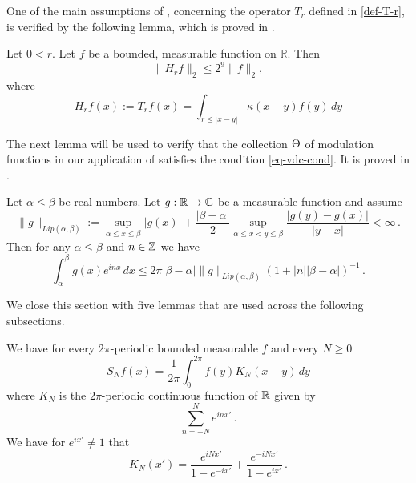 One of the main assumptions of , concerning the operator $T_r$ defined in \eqref{def-T-r}, is verified by the following lemma, which is proved in .
\begin{lemma}
    \label{Hilbert-strong-2-2}
    \leanok
    Let $0<r$. Let $f$ be a bounded, measurable function on $\mathbb{R}$. Then
    \begin{equation}
        \label{eq-Hr-L2-bound}
        \|H_rf\|_{2}\leq 2^{9} \|f\|_2,
    \end{equation}
    where
    \begin{equation}
        \label{def-H-r}
        H_r f(x) := T_r f(x) = \int_{r\le |x-y|} \kappa(x-y) f(y) \, dy
    \end{equation}
\end{lemma}

The next lemma will be used to verify that the collection ${\Theta}$ of modulation functions in our application of  satisfies the condition \eqref{eq-vdc-cond}.
It is proved in .

\begin{lemma}
\label{van-der-Corput}
\leanok
{}
    Let $\alpha\le\beta$ be real numbers. Let $g:{\mathbb{R}}\to \mathbb{C}$ be a measurable function and assume
    \begin{equation}
        \|g\|_{Lip(\alpha,\beta)}:=\sup_{\alpha\le x\le \beta}|g(x)|+\frac{|\beta-\alpha|}{2}
        \sup_{\alpha\le x<y\le \beta} \frac {|g(y)-g(x)|}{|y-x|}<\infty\, .
    \end{equation}
    Then for any $\alpha \le \beta$ and $n\in{\mathbb{Z}}$ we have
    \begin{equation}
        \int _{\alpha}^{\beta} g(x) e^{inx}\, dx\le 2\pi |\beta-\alpha|\|g\|_{Lip(\alpha,\beta)}(1+|n||\beta-\alpha|)^{-1}\, .
    \end{equation}

\end{lemma}


We close this section with five lemmas that are used
across the following subsections.

\begin{lemma}
\label{Dirichlet-kernel}
\leanok
{}
We have for every $2\pi$-periodic bounded measurable $f$ and every $N\ge 0$
\begin{equation}
    S_Nf(x)=\frac 1{2\pi}\int_{0}^{2\pi}f(y) K_N(x-y)\, dy
\end{equation}
where $K_N$ is the $2\pi$-periodic continuous function of
${\mathbb{R}}$ given by
\begin{equation}\label{eqksumexp}
\sum_{n=-N}^N e^{in x'}\, .
\end{equation}
We have for $e^{ix'}\neq 1$ that
\begin{equation}\label{eqksumhil}
    K_N(x')=\frac{e^{iNx'}}{1-e^{-ix'}}
      +\frac {e^{-iNx'}}{1-e^{ix'}} \, .
\end{equation}


\end{lemma}


